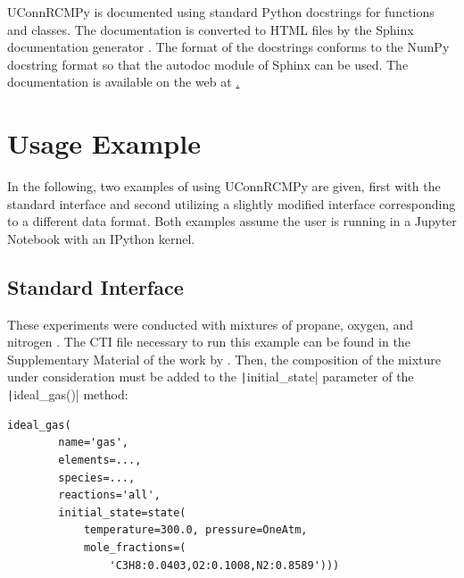 \documentclass[12pt]{../ussci}
\begin{document}
UConnRCMPy is documented using standard Python docstrings for functions
and classes. The documentation is converted to HTML files by the Sphinx
documentation generator \autocite{Brandl2016}. The format of the
docstrings conforms to the NumPy docstring format so that the autodoc
module of Sphinx can be used. The documentation is available on the web
at \href{https://bryanwweber.github.io/UConnRCMPy/}.

\section{Usage Example}\label{usage-example}

In the following, two examples of using UConnRCMPy are given, first with
the standard interface and second utilizing a slightly modified
interface corresponding to a different data format. Both examples assume
the user is running in a Jupyter Notebook with an IPython kernel.

\subsection{Standard Interface}\label{standard-interface}

These experiments were conducted with mixtures of propane, oxygen, and
nitrogen \autocite{Dames2016}. The CTI file necessary to run this
example can be found in the Supplementary Material of the work by
\textcite{Dames2016}. Then, the composition of the mixture under consideration
must be added to the \texttt|initial_state| parameter of the
\texttt|ideal_gas()| method:

\begin{verbatim}
ideal_gas(
        name='gas',
        elements=...,
        species=...,
        reactions='all',
        initial_state=state(
            temperature=300.0, pressure=OneAtm,
            mole_fractions=(
                'C3H8:0.0403,O2:0.1008,N2:0.8589')))
\end{verbatim}
\end{document}
